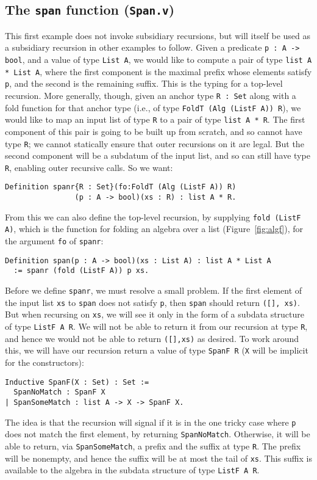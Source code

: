 \documentclass[a4paper,USenglish]{lipics-v2021}
\begin{document}
\subsection{The \texttt{span} function (\texttt{Span.v})}

This first example does not invoke subsidiary recursions, but will
itself be used as a subsidiary recursion in other examples to follow.
Given a predicate \verb|p : A -> bool|, and a value of type
\verb|List A|, we would like to compute a pair of type
\verb|list A * List A|, where the first component is the maximal
prefix whose elements satisfy \verb|p|, and the second is the
remaining suffix.  This is the typing for a top-level recursion.  More
generally, though, given an anchor type \verb|R : Set| along with a
fold function for that anchor type (i.e., of type
\verb|FoldT (Alg (ListF A)) R|), we would like to map an input list of
type \verb|R| to a pair of type \verb|list A * R|.  The first
component of this pair is going to be built up from scratch, and so
cannot have type \verb|R|; we cannot statically ensure that outer
recursions on it are legal.  But the second component will be a
subdatum of the input list, and so can still have type \verb|R|,
enabling outer recursive calls.  So we want:
\begin{verbatim}
Definition spanr{R : Set}(fo:FoldT (Alg (ListF A)) R)
                (p : A -> bool)(xs : R) : list A * R.
\end{verbatim}
\noindent From this we can also define the top-level recursion, by
supplying \verb|fold (ListF A)|, which is the function for folding an algebra
over a list (Figure~\ref{fig:algf}), for the argument \verb|fo| of \verb|spanr|:
\begin{verbatim}
Definition span(p : A -> bool)(xs : List A) : list A * List A
  := spanr (fold (ListF A)) p xs.
\end{verbatim}

Before we define \verb|spanr|, we must resolve a small problem.
If the first element of the input list
\verb|xs| to \verb|span| does not satisfy \verb|p|, then \verb|span|
should return \verb|([], xs)|.  But when recursing on \verb|xs|, we
will see it only in the form of a subdata structure of type
\verb|ListF A R|.  We will not be able to return it from our recursion at
type \verb|R|, and hence we would not be able to return \verb|([],xs)|
as desired.  To work around this, we will have our recursion return a value
of type \verb|SpanF R| (\verb|X| will be implicit for the constructors):
\begin{verbatim}
Inductive SpanF(X : Set) : Set :=
  SpanNoMatch : SpanF X
| SpanSomeMatch : list A -> X -> SpanF X.
\end{verbatim}
\noindent The idea is that the recursion will signal if it is in the
one tricky case where \verb|p| does not match the first element, by
returning \verb|SpanNoMatch|.  Otherwise, it will be able to return,
via \verb|SpanSomeMatch|, a prefix and the suffix at type
\verb|R|. The prefix will be nonempty, and hence the suffix will be at
most the tail of \verb|xs|.  This suffix is available to the algebra
in the subdata structure of type \verb|ListF A R|.
\end{document}
